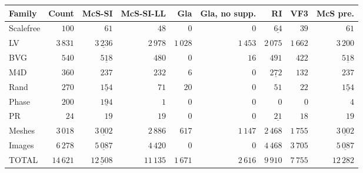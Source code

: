 
\begin{tabular}{lrrrrrrrr}
    \toprule
    Family & Count & McS-SI & McS-SI-LL & Gla & Gla, no supp. & RI & VF3 & McS pre.\\
    \midrule

\rule{0pt}{2.3ex}Scalefree & $100$ & $61$ & $48$ & $0$ & $0$ & $\underline{64}$ & $39$ & $61$\\
\rule{0pt}{2.3ex}LV & $3\,831$ & $\underline{3\,236}$ & $2\,978$ & $1\,028$ & $1\,453$ & $2\,075$ & $1\,662$ & $3\,200$\\
\rule{0pt}{2.3ex}BVG & $540$ & $\underline{518}$ & $480$ & $0$ & $16$ & $491$ & $422$ & $\underline{518}$\\
\rule{0pt}{2.3ex}M4D & $360$ & $237$ & $232$ & $6$ & $0$ & $\underline{272}$ & $132$ & $237$\\
\rule{0pt}{2.3ex}Rand & $270$ & $\underline{154}$ & $71$ & $20$ & $0$ & $51$ & $22$ & $\underline{154}$\\
\rule{0pt}{2.3ex}Phase & $200$ & $\underline{194}$ & $1$ & $0$ & $0$ & $0$ & $0$ & $4$\\
\rule{0pt}{2.3ex}PR & $24$ & $19$ & $19$ & $0$ & $0$ & $\underline{21}$ & $18$ & $19$\\
\rule{0pt}{2.3ex}Meshes & $3\,018$ & $\underline{3\,002}$ & $2\,886$ & $617$ & $1\,147$ & $2\,468$ & $1\,755$ & $\underline{3\,002}$\\
\rule{0pt}{2.3ex}Images & $6\,278$ & $\underline{5\,087}$ & $4\,420$ & $0$ & $0$ & $4\,468$ & $3\,705$ & $\underline{5\,087}$\\
\midrule
\rule{0pt}{2.3ex}TOTAL & $14\,621$ & $\underline{12\,508}$ & $11\,135$ & $1\,671$ & $2\,616$ & $9\,910$ & $7\,755$ & $12\,282$\\

    \bottomrule
\end{tabular}

